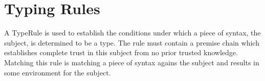 \section{Typing Rules}
\label{section-rules}

A TypeRule is used to establish the conditions under which a piece
of syntax, the subject, is determined to be a type. The rule
must contain a premise chain which establishes complete trust in
this subject from no prior trusted knowledge. Matching this rule is
matching a piece of syntax agains the subject and results in some
environment for the subject.

